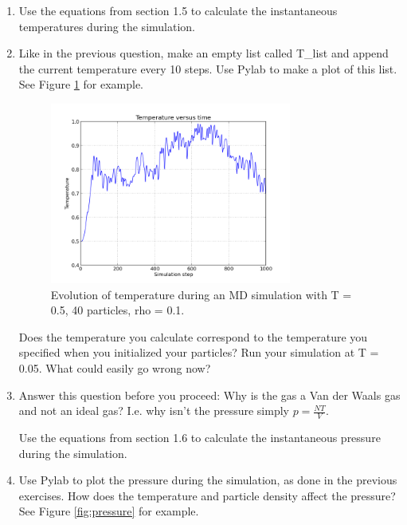 \documentclass{article}
\begin{document}
\begin{enumerate}
    \item Use the equations from section 1.5 to calculate the instantaneous
    temperatures during the simulation. 

    \item Like in the previous question, make an empty list called T\_list and
    append the current temperature every 10 steps. Use Pylab to make a plot of
    this list. See Figure \ref{fig:temperature} for example.

    \begin{figure}[h!]
        \begin{center}
            \includegraphics[width=0.75\textwidth]{temperature.png}
            \caption{Evolution of temperature during an MD simulation with T = 0.5, 40 particles, rho = 0.1.}
            \label{fig:temperature}
        \end{center}
    \end{figure}

    Does the temperature you calculate correspond to the temperature you
    specified when you initialized your particles? Run your simulation at T =
    0.05. What could easily go wrong now?

    \item Answer this question before you proceed: Why is the gas a Van der
        Waals gas and not an ideal gas? I.e. why isn't the pressure simply $p =
        \frac{N T}{V}$.

    Use the equations from section 1.6 to calculate the instantaneous pressure during the simulation. 

    \item Use Pylab to plot the pressure during the simulation, as done in the
        previous exercises. How does the temperature and particle density
        affect the pressure? See Figure \ref{fig:pressure} for example.


\end{enumerate}
\end{document}
